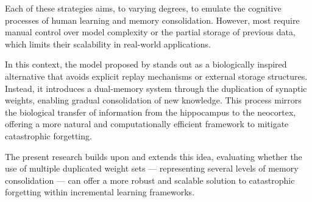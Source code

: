 Each of these strategies aims, to varying degrees, to emulate the cognitive processes of human learning and memory consolidation.  
However, most require manual control over model complexity or the partial storage of previous data, which limits their scalability in real-world applications.

In this context, the model proposed by \cite{bullinaria2009} stands out as a biologically inspired alternative that avoids explicit replay mechanisms or external storage structures.  
Instead, it introduces a dual-memory system through the duplication of synaptic weights, enabling gradual consolidation of new knowledge.  
This process mirrors the biological transfer of information from the hippocampus to the neocortex, offering a more natural and computationally efficient framework to mitigate catastrophic forgetting.

The present research builds upon and extends this idea, evaluating whether the use of multiple duplicated weight sets — representing several levels of memory consolidation — can offer a more robust and scalable solution to catastrophic forgetting within incremental learning frameworks.
